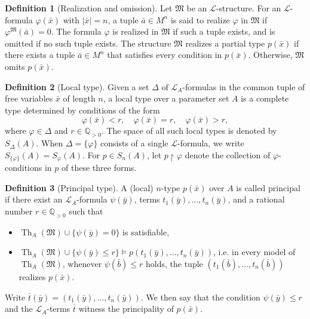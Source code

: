 \documentclass{amsart}
\theoremstyle{definition}
\newtheorem{definition}{Definition}[section]
\theoremstyle{remark}
\numberwithin{equation}{section}
\begin{document}
\begin{definition}[Realization and omission]
	Let $\mathfrak M$ be an $\mathcal L$-structure. For an $\mathcal L$-formula $\varphi(\bar x)$ with $|\bar x|=n$, a tuple
	$\bar a\in M^{n}$ is said to realize $\varphi$ in
	$\mathfrak M$ if
	$\varphi^{\mathfrak M}(\bar a)=0$.
	The formula $\varphi$ is realized in $\mathfrak M$ if such a tuple exists, and is omitted if no such tuple exists.
	The structure $\mathfrak M$ realizes a partial type $p(\bar x)$ if there exists a tuple $\bar a\in M^n$ that satisfies every condition in $p(\bar x)$. Otherwise, $\mathfrak M$ omits $p(\bar x)$.
\end{definition}


\begin{definition}[Local type]
	Given a set $\Delta$ of $\mathcal L_A$-formulas in the common tuple of free variables $\bar x$ of length $n$, a {local type} over a parameter set $A$ is a complete type determined by conditions of the form
	$$\varphi(\bar x)<r,\quad\varphi(\bar x)=r,\quad\varphi(\bar x)>r,$$
	where $\varphi\in\Delta$ and $r\in\mathbb Q_{>0}$. The space of all such local types is denoted by $S_{\Delta}(A)$. When $\Delta=\{\varphi\}$ consists of a single $\mathcal L$-formula, we write $S_{\{\varphi\}}(A)=S_\varphi(A)$. For $p\in S_n(A)$, let $p\upharpoonright\varphi$ denote the collection of $\varphi$-conditions in $p$ of these three forms.
\end{definition}


\begin{definition}[Principal type]
	A (local) $n$-type $p(\bar x)$ over $A$ is called {principal} if there exist an $\mathcal L_A$-formula $\psi(\bar y)$, terms $t_1(\bar y),\dots,t_n(\bar y)$, and a rational number $r\in\mathbb Q_{>0}$ such that
	\begin{itemize}
		\item $\operatorname{Th}_A(\mathfrak M)\cup\{\psi(\bar y)=0\}$ is satisfiable,
		\item $\operatorname{Th}_A(\mathfrak M)\cup\{\psi(\bar y)\le r\}\models p(t_1(\bar y),\dots,t_n(\bar y))$, i.e. in every model of $\operatorname{Th}_A(\mathfrak M)$, whenever $\psi(\bar b)\le r$ holds, the tuple $(t_1(\bar b),\dots,t_n(\bar b))$ realizes $p(\bar{x})$.
	\end{itemize}
	Write $\bar t(\bar y)=(t_1(\bar y),\ldots,t_n(\bar y))$. We then say that the condition $\psi(\bar y)\le r$ and the $\mathcal L_A$-terms $\bar t$ {witness} the principality of $p(\bar x)$.
\end{definition}
\end{document}
